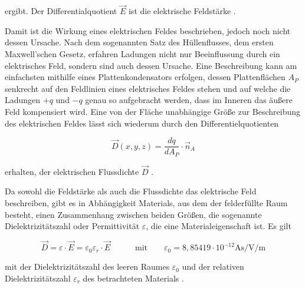 ergibt. Der Differentialquotient $\vec E$ ist die elektrische Feldstärke \cite{EM_Schirmung}. \par
\vspace{\baselineskip}
Damit ist die Wirkung eines elektrischen Feldes beschrieben, jedoch noch nicht dessen Ursache. Nach dem sogenannten Satz des Hüllenflusses, dem ersten Maxwell'schen Gesetz, erfahren Ladungen nicht nur Beeinflussung durch ein elektrisches Feld, sondern sind auch dessen Ursache. Eine Beschreibung kann am einfachsten mithilfe eines Plattenkondensators erfolgen, dessen Plattenflächen $A_P$ senkrecht auf den Feldlinien eines elektrisches Feldes stehen und auf welche die Ladungen $+q$ und $-q$ genau so aufgebracht werden, dass im Inneren das äußere Feld kompensiert wird. Eine von der Fläche unabhängige Größe zur Beschreibung des elektrischen Feldes lässt sich wiederum durch den Differentielquotienten 

\begin{equation}
    \vec D(x,y,z) = \frac{dq}{dA_P} \cdot \vec n_A
\end{equation}

erhalten, der elektrischen Flussdichte $\vec D$ \cite{EM_Schirmung}. \par
\vspace{\baselineskip}

Da sowohl die Feldstärke als auch die Flussdichte das elektrische Feld beschreiben, gibt es in Abhängigkeit Materials, aus dem der felderfüllte Raum besteht, einen Zusammenhang zwischen beiden Größen, die sogenannte Dielektrizitätszahl oder Permittivität $\varepsilon$, die eine Materialeigenschaft ist. Es gilt

\begin{equation}
    \vec D = \varepsilon \cdot \vec E = \varepsilon_0 \varepsilon_r \cdot \vec E \qquad \quad \text{mit} \qquad \varepsilon_0 = 8,85419 \cdot 10^{-12} \si{\ampere\second\per\volt\per\meter}
\end{equation}

mit der Dielektrizitätszahl des leeren Raumes $\varepsilon_0$ und der relativen Dielektrizitätszahl $\varepsilon_r$ des betrachteten Materials \cite{EM_Schirmung}.